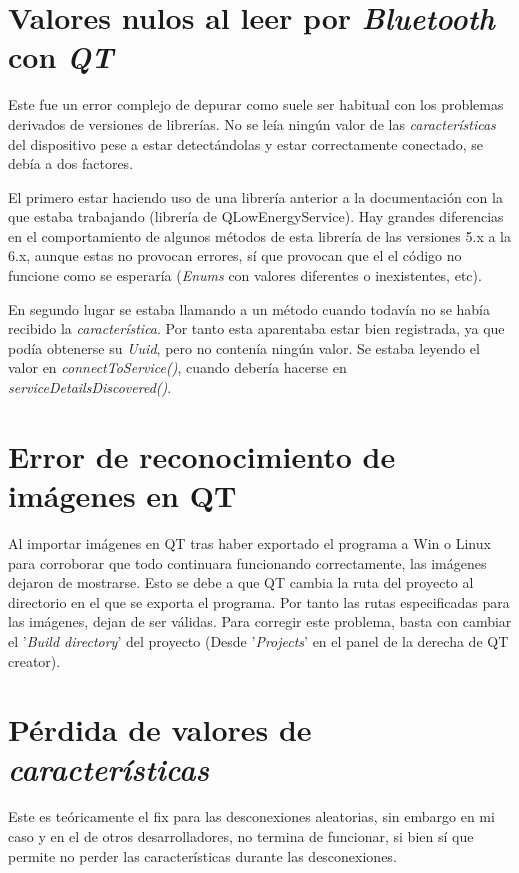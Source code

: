 \begin{appendices}
\section{Valores nulos al leer por \textit{Bluetooth} con \textit{QT}}
Este fue un error complejo de depurar como suele ser habitual
con los problemas derivados de versiones de librerías. No se
leía ningún valor de las \textit{características} del dispositivo pese a estar detectándolas y estar
correctamente conectado, se debía a dos factores.

El primero estar haciendo uso de una librería anterior a la documentación con
la que estaba trabajando (librería de QLowEnergyService). Hay grandes diferencias
en el comportamiento de algunos métodos de esta librería de las versiones 5.x
a la 6.x, aunque estas no provocan errores, sí que provocan que el
el código no funcione como se esperaría (\textit{Enums} con valores diferentes o inexistentes, etc).


En segundo lugar se estaba llamando a un método cuando todavía no se había recibido
la \textit{característica}. Por tanto esta aparentaba estar bien registrada, ya que
podía obtenerse su \textit{Uuid}, pero no contenía ningún valor.
Se estaba leyendo el valor en \textit{connectToService()},
cuando debería hacerse en \textit{serviceDetailsDiscovered()}.


\section{Error de reconocimiento de imágenes en QT}
Al importar imágenes en QT tras haber exportado el programa a Win o Linux para
corroborar que todo continuara funcionando correctamente, las imágenes
dejaron de mostrarse.
Esto se debe a que QT cambia la ruta del proyecto al directorio en el que se
exporta el programa. Por tanto las rutas especificadas para las imágenes, dejan de ser
válidas. Para corregir este problema, basta con cambiar el '\textit{Build directory}'
del proyecto (Desde '\textit{Projects}' en el panel de la derecha de QT creator).


\section{Pérdida de valores de \textit{características}\label{errlibQTBT}}
Este es teóricamente el fix para las desconexiones aleatorias,
sin embargo en mi caso y en el de otros desarrolladores, no termina
de funcionar, si bien sí que permite no perder las características
durante las desconexiones. \cite{carBTQT}


\end{appendices}

